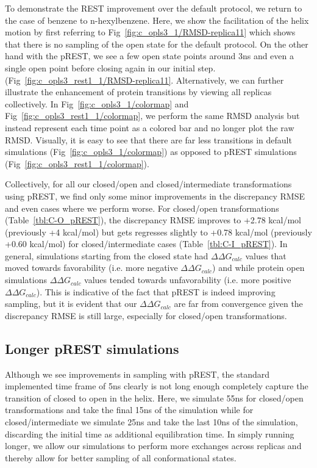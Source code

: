\documentclass[journal=jctcce,manuscript=article]{achemso}
\begin{document}
To demonstrate the REST improvement over the default protocol, we return to the case of benzene to n-hexylbenzene.
Here, we show the facilitation of the helix motion by first referring to Fig~\ref{fig:c_opls3_1/RMSD-replica11} which shows that there is no sampling of the open state for the default protocol.
On the other hand with the pREST, we see a few open state points around 3ns and even a single open point before closing again in our initial step. (Fig~\ref{fig:c_opls3_rest1_1/RMSD-replica11}.
Alternatively, we can further illustrate the enhancement of protein transitions by viewing all replicas collectively. 
In Fig~\ref{fig:c_opls3_1/colormap} and Fig~\ref{fig:c_opls3_rest1_1/colormap}, we perform the same RMSD analysis but instead represent each time point as a colored bar and no longer plot the raw RMSD.
Visually, it is easy to see that there are far less transitions in default simulations (Fig~\ref{fig:c_opls3_1/colormap}) as opposed to pREST simulations (Fig~\ref{fig:c_opls3_rest1_1/colormap}).
 
Collectively, for all our closed/open and closed/intermediate transformations using pREST, we find only some minor improvements in the discrepancy RMSE and even cases where we perform worse.
For closed/open transformations (Table~\ref{tbl:C-O_pREST}), the discrepancy RMSE improves to +2.78 kcal/mol (previously +4 kcal/mol) but gets regresses slightly to +0.78 kcal/mol (previously +0.60 kcal/mol) for closed/intermediate cases (Table~\ref{tbl:C-I_pREST}).
In general, simulations starting from the closed state had $\Delta\Delta G_{calc}$ values that moved towards favorability (i.e. more negative $\Delta\Delta G_{calc}$) and while protein open simulations $\Delta\Delta G_{calc}$ values tended towards unfavorability (i.e. more positive $\Delta\Delta G_{calc}$).
This is indicative of the fact that pREST is indeed improving sampling, but it is evident that our $\Delta\Delta G_{calc}$ are far from convergence given the discrepancy RMSE is still large, especially for closed/open transformations.

\subsection*{Longer pREST simulations}
Although we see improvements in sampling with pREST, the standard implemented time frame of 5ns clearly is not long enough completely capture the transition of closed to open in the helix.
Here, we simulate 55ns for closed/open transformations and take the final 15ns of the simulation while for closed/intermediate we simulate 25ns and take the last 10ns of the simulation, discarding the initial time as additional equilibration time. %
In simply running longer, we allow our simulations to perform more exchanges across replicas and thereby allow for better sampling of all conformational states.
\end{document}

